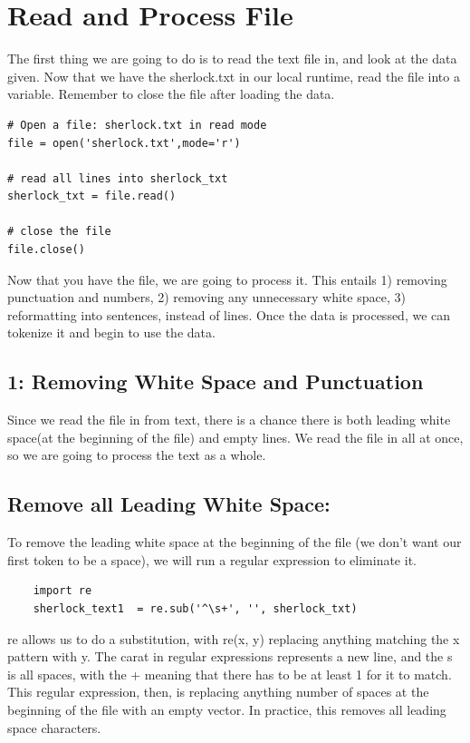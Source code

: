 \documentclass{article}
\begin{document}
\section{Read and Process File}

The first thing we are going to do is to read the text file in, and look at the data given. Now that we have the sherlock.txt in our local runtime, read the file into a variable. Remember to close the file after loading the data.

\begin{verbatim}
# Open a file: sherlock.txt in read mode
file = open('sherlock.txt',mode='r')
 
# read all lines into sherlock_txt
sherlock_txt = file.read()
 
# close the file
file.close()
\end{verbatim}

Now that you have the file, we are going to process it. This entails
1) removing punctuation and numbers, 2) removing any unnecessary white space, 3) reformatting into sentences, instead of lines. Once the data is processed, we can tokenize it and begin to use the data.

\subsection{1: Removing White Space and Punctuation}

Since we read the file in from text, there is a chance there is both leading white space(at the beginning of the file) and empty lines. We read the file in all at once, so we are going to process the text as a whole. 

\subsection{Remove all Leading White Space:}

To remove the leading white space at the beginning of the file (we don't want our first token to be a space), we will run a regular expression to eliminate it.
\begin{verbatim}
    import re
    sherlock_text1  = re.sub('^\s+', '', sherlock_txt)
\end{verbatim}

re allows us to do a substitution, with re(x, y) replacing anything matching the x pattern with y. The carat in regular expressions represents a new line, and the s is all spaces, with the + meaning that there has to be at least 1 for it to match. This regular expression, then, is replacing anything number of spaces at the beginning of the file with an empty vector. In practice, this removes all leading space characters. 
\end{document}
